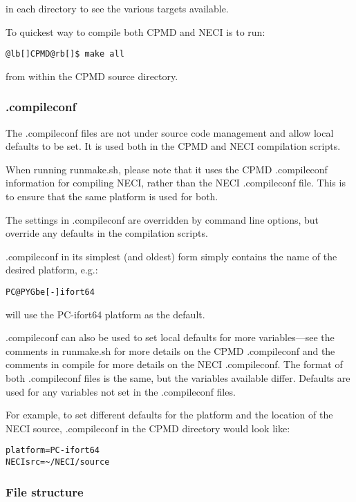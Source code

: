 \documentclass[openany,a4paper,10pt]{manual}
\begin{document}
in each directory to see the various targets available.

To quickest way to compile both CPMD and NECI is to run:

\begin{Verbatim}[commandchars=@\[\]]
@lb[]CPMD@rb[]$ make all
\end{Verbatim}

from within the CPMD source directory.


\subsubsection{.compileconf}

The .compileconf files are not under source code management and allow local defaults
to be set.  It is used both in the CPMD and NECI compilation scripts.

When running runmake.sh, please note that it uses the CPMD .compileconf information
for compiling NECI, rather than the NECI .compileconf file.  This is to ensure that
the same platform is used for both.

The settings in .compileconf are overridden by command line options, but override
any defaults in the compilation scripts.

.compileconf in its simplest (and oldest) form simply contains the name of the desired
platform, e.g.:

\begin{Verbatim}[commandchars=@\[\]]
PC@PYGbe[-]ifort64
\end{Verbatim}

will use the PC-ifort64 platform as the default.

.compileconf can also be used to set local defaults for more
variables---see the comments in runmake.sh for more details on the CPMD
.compileconf and the comments in compile for more details on the NECI
.compileconf.  The format of both .compileconf files is the same, but the
variables available differ.  Defaults are used for any variables not set
in the .compileconf files.

For example, to set different defaults for the platform
and the location of the NECI source, .compileconf in the CPMD directory
would look like:

\begin{Verbatim}[commandchars=@\[\]]
platform=PC-ifort64
NECIsrc=~/NECI/source
\end{Verbatim}


\subsubsection{File structure}
\end{document}
